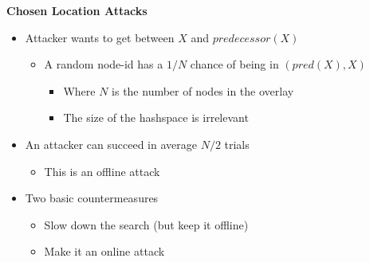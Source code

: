 \documentclass[helvetica]{seminar}
\newcommand{\heading}[1]{%
  \begin{center} 
    \large\bf 
    #1 
  \end{center} 
  \vspace{.4 in}}
\begin{document}
\begin{slide}
\heading{Chosen Location Attacks}

\begin{itemize}
\item Attacker wants to get between $X$ and $predecessor(X)$
\begin{itemize}
\item A random node-id has a $1/N$ chance of being in $(pred(X),X)$
\begin{itemize}
\item Where $N$ is the number of nodes in the overlay
\item The size of the hashspace is irrelevant
\end{itemize}
\end{itemize}
\item An attacker can succeed in average $N/2$ trials
\begin{itemize}
\item This is an offline attack
\end{itemize}
\item Two basic countermeasures
\begin{itemize}
\item Slow down the search (but keep it offline)
\item Make it an online attack
\end{itemize}
\end{itemize}
\end{slide}
\end{document}
